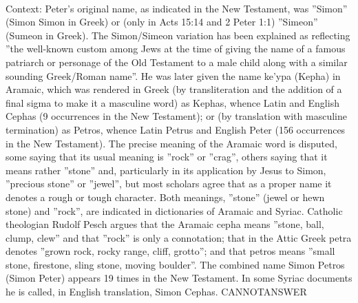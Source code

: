 \documentclass[11pt,a4paper, onecolumn]{article}
\begin{document}
\\ Context: Peter's original name, as indicated in the New Testament, was ''Simon'' (Simon Simon in Greek) or (only in Acts 15:14 and 2 Peter 1:1) ''Simeon'' (Sumeon in Greek). The Simon/Simeon variation has been explained as reflecting ''the well-known custom among Jews at the time of giving the name of a famous patriarch or personage of the Old Testament to a male child along with a similar sounding Greek/Roman name''. He was later given the name ke'ypa (Kepha) in Aramaic, which was rendered in Greek (by transliteration and the addition of a final sigma to make it a masculine word) as Kephas, whence Latin and English Cephas (9 occurrences in the New Testament); or (by translation with masculine termination) as Petros, whence Latin Petrus and English Peter (156 occurrences in the New Testament). The precise meaning of the Aramaic word is disputed, some saying that its usual meaning is ''rock'' or ''crag'', others saying that it means rather ''stone'' and, particularly in its application by Jesus to Simon, ''precious stone'' or ''jewel'', but most scholars agree that as a proper name it denotes a rough or tough character. Both meanings, ''stone'' (jewel or hewn stone) and ''rock'', are indicated in dictionaries of Aramaic and Syriac. Catholic theologian Rudolf Pesch argues that the Aramaic cepha means ''stone, ball, clump, clew'' and that ''rock'' is only a connotation; that in the Attic Greek petra denotes ''grown rock, rocky range, cliff, grotto''; and that petros means ''small stone, firestone, sling stone, moving boulder''. The combined name Simon Petros (Simon Peter) appears 19 times in the New Testament. In some Syriac documents he is called, in English translation, Simon Cephas. CANNOTANSWER
\end{document}

